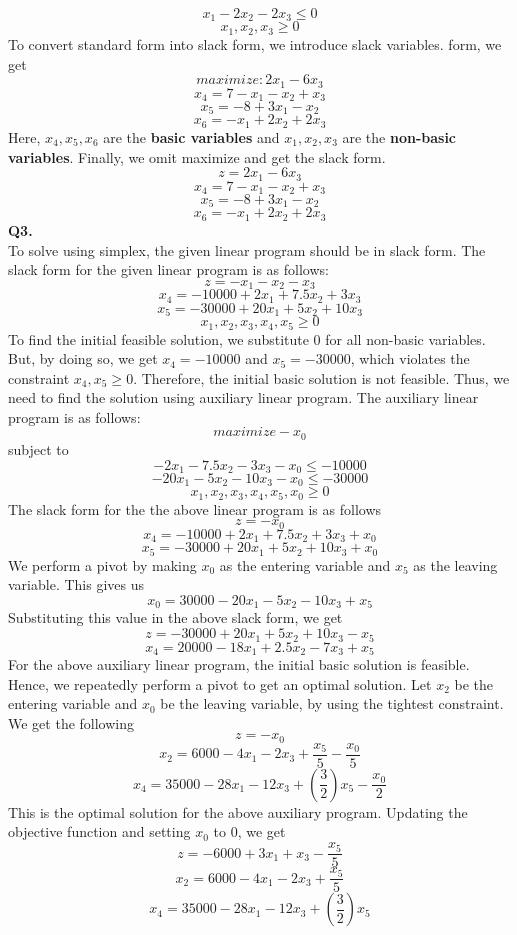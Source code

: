 \documentclass[11pt]{article}
\begin{document}
$$x_1 - 2x_2 - 2x_3 \leq 0$$
$$x_1,x_2,x_3 \geq 0$$
To convert standard form into slack form, we introduce slack variables.
form, we get
$$maximize: 2x_1 - 6x_3$$
$$x_4 = 7 - x_1 - x_2 + x_3$$
$$x_5 = -8 + 3x_1 - x_2$$
$$x_6 = - x_1 + 2x_2 + 2x_3$$
Here, $x_4,x_5,x_6$ are the \textbf{basic variables} and $x_1,x_2,x_3$ are the \textbf{non-basic variables}. Finally, we omit maximize and get the slack form.
$$z = 2x_1 - 6x_3$$
$$x_4 = 7 - x_1 - x_2 + x_3$$
$$x_5 = -8 + 3x_1 - x_2$$
$$x_6 = - x_1 + 2x_2 + 2x_3$$
\vspace{5mm}
\hline
\vspace{5mm}
\textbf{Q3.}\\
To solve using simplex, the given linear program should be in slack form. The slack form for the given linear program is as follows:
$$z = -x_1 - x_2 - x_3$$
$$x_4 = -10000 + 2x_1 + 7.5x_2 + 3x_3$$
$$x_5 = -30000 + 20x_1 + 5x_2 + 10x_3$$
$$x_1,x_2,x_3,x_4,x_5 \geq 0$$
To find the initial feasible solution, we substitute 0 for all non-basic variables. But, by doing so, we get $x_4 = -10000$ and $x_5 = -30000$, which violates the constraint $x_4,x_5 \geq 0$. Therefore, the initial basic solution is not feasible. Thus, we need to find the solution using auxiliary linear program. The auxiliary linear program is as follows:
$$ maximize -x_0$$
subject to
$$-2x_1 - 7.5x_2 - 3x_3 - x_0 \leq -10000$$
$$-20x_1 - 5x_2 - 10x_3 - x_0 \leq -30000$$
$$x_1,x_2,x_3,x_4,x_5,x_0 \geq 0$$
The slack form for the the above linear program is as follows
$$z = -x_0$$
$$x_4 = -10000 + 2x_1 + 7.5x_2 + 3x_3 + x_0$$
$$x_5 = -30000 + 20x_1 + 5x_2 + 10x_3 + x_0$$
We perform a pivot by making $x_0$ as the entering variable and $x_5$ as the leaving variable. This gives us
$$x_0 = 30000 - 20x_1 - 5x_2 - 10x_3 + x_5$$
Substituting this value in the above slack form, we get
$$z = -30000 + 20x_1 + 5x_2 + 10x_3 - x_5$$
$$x_4 = 20000 - 18x_1 + 2.5x_2 - 7x_3 + x_5$$
For the above auxiliary linear program, the initial basic solution is feasible. Hence, we repeatedly perform a pivot to get an optimal solution. Let $x_2$ be the entering variable and $x_0$ be the leaving variable, by using the tightest constraint. We get the following
$$z = -x_0$$
$$x_2 = 6000 - 4x_1 - 2x_3 + \frac{x_5}{5} - \frac{x_0}{5}$$
$$x_4 = 35000 - 28x_1 - 12x_3 + \left(\frac{3}{2}\right)x_5 - \frac{x_0}{2}$$
This is the optimal solution for the above auxiliary program. Updating the objective function and setting $x_0$ to 0, we get
$$z = -6000 + 3x_1 + x_3 - \frac{x_5}{5}$$
$$x_2 = 6000 - 4x_1 - 2x_3 + \frac{x_5}{5}$$
$$x_4 = 35000 - 28x_1 - 12x_3 + \left(\frac{3}{2}\right)x_5$$
\end{document}
